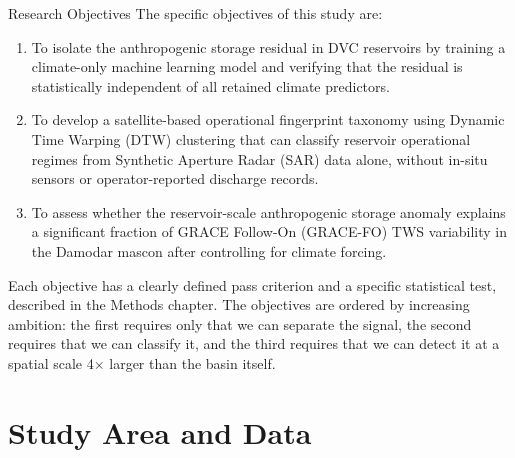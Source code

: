 \documentclass[10pt]{beamer}
\begin{document}
\begin{frame}{Research Objectives}
  \small
  The specific objectives of this study are:

  \smallskip
  \begin{enumerate}[label=(\alph*)]\footnotesize
    \item To isolate the anthropogenic storage residual in DVC reservoirs by
      training a climate-only machine learning model and verifying that the
      residual is statistically independent of all retained climate predictors.
    \item To develop a satellite-based operational fingerprint taxonomy using
      Dynamic Time Warping (DTW) clustering that can classify reservoir
      operational regimes from Synthetic Aperture Radar (SAR) data alone,
      without in-situ sensors or operator-reported discharge records.
    \item To assess whether the reservoir-scale anthropogenic storage anomaly
      explains a significant fraction of GRACE Follow-On (GRACE-FO) TWS
      variability in the Damodar mascon after controlling for climate forcing.
  \end{enumerate}

  \smallskip
  \small
  Each objective has a clearly defined pass criterion and a specific statistical
  test, described in the Methods chapter. The objectives are ordered by
  increasing ambition: the first requires only that we can separate the signal,
  the second requires that we can classify it, and the third requires that we
  can detect it at a spatial scale 4$\times$ larger than the basin itself.
\end{frame}


\section{Study Area and Data}
\end{document}
